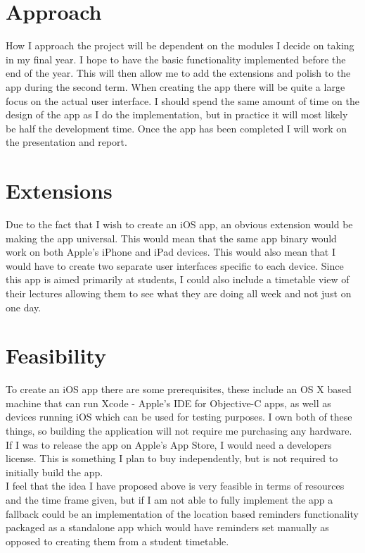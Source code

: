 \documentclass[12pt]{article}
\begin{document}
\section*{Approach}
How I approach the project will be dependent on the modules I decide on taking in my final year. I hope to have the basic functionality implemented before the end of the year. This will then allow me to add the extensions and polish to the app during the second term. When creating the app there will be quite a large focus on the actual user interface. I should spend the same amount of time on the design of the app as I do the implementation, but in practice it will most likely be half the development time. Once the app has been completed I will work on the presentation and report.

\section*{Extensions}
Due to the fact that I wish to create an iOS app, an obvious extension would be making the app universal. This would mean that the same app binary would work on both Apple's iPhone and iPad devices. This would also mean that I would have to create two separate user interfaces specific to each device. Since this app is aimed primarily at students, I could also include a timetable view of their lectures allowing them to see what they are doing all week and not just on one day.

\section*{Feasibility}
To create an iOS app there are some prerequisites, these include an OS X based machine that can run Xcode - Apple's IDE for Objective-C apps, as well as devices running iOS which can be used for testing purposes. I own both of these things, so building the application will not require me purchasing any hardware. If I was to release the app on Apple's App Store, I would need a developers license. This is something I plan to buy independently, but is not required to initially build the app.\\ I feel that the idea I have proposed above is very feasible in terms of resources and the time frame given, but if I am not able to fully implement the app a fallback could be an implementation of the location based reminders functionality packaged as a standalone app which would have reminders set manually as opposed to creating them from a student timetable. 
\end{document}
